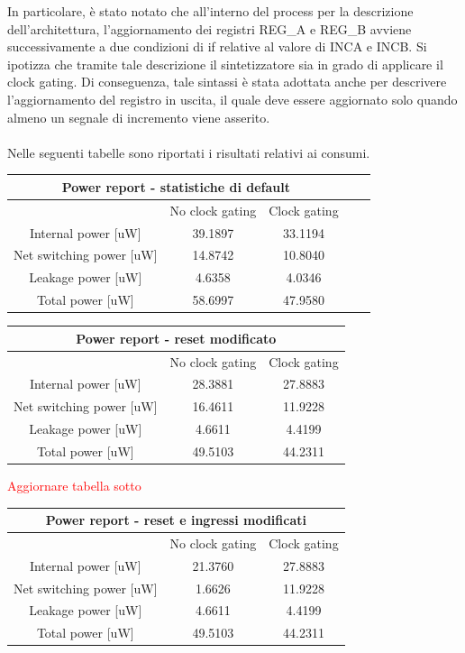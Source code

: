 \documentclass[11pt,  english, makeidx, a4paper, titlepage, oneside]{book}
\begin{document}
In particolare, è stato notato che all'interno del process per la descrizione dell'architettura, l'aggiornamento dei registri REG\_A e REG\_B avviene successivamente a due condizioni di if relative al valore di INCA e INCB. Si ipotizza che tramite tale descrizione il sintetizzatore sia in grado di applicare il clock gating. Di conseguenza, tale sintassi è stata adottata anche per descrivere l'aggiornamento del registro in uscita, il quale deve essere aggiornato solo quando almeno un segnale di incremento viene asserito.
\\\\
Nelle seguenti tabelle sono riportati i risultati relativi ai consumi.      
\begin{center}
	\begin{tabular}{|c|c|c|c|c|}
	\hline
	\multicolumn{3}{c}{Power report - statistiche di default}\\
	\hline
	& No clock gating & Clock gating \\
	\hline
	Internal power [uW] & 39.1897 & 33.1194 \\
	\hline
	Net switching power [uW] & 14.8742  & 10.8040 \\
	\hline
	Leakage power [uW] & 4.6358 & 4.0346 \\
	\hline
	Total power [uW] & 58.6997 & 47.9580 \\
	\hline
	\end{tabular}	
\end{center}
\vspace{0.3cm}      
\begin{center}
	\begin{tabular}{|c|c|c|}
	\hline
	\multicolumn{3}{c}{Power report - reset modificato}\\
	\hline
	& No clock gating & Clock gating \\
	\hline
	Internal power [uW] & 28.3881 & 27.8883 \\
	\hline 
 	Net switching power [uW] & 16.4611 & 11.9228 \\
	\hline
	Leakage power [uW] & 4.6611 & 4.4199 \\
	\hline
	Total power [uW] & 49.5103 & 44.2311 \\
	\hline
	\end{tabular}	
\end{center}
\vspace{0.3cm} 
\textcolor{red}{Aggiornare tabella sotto}          
\begin{center}
	\begin{tabular}{|c|c|c|}
	\hline
	\multicolumn{3}{c}{Power report - reset e ingressi modificati}\\
	\hline
	& No clock gating & Clock gating \\
	\hline
	Internal power [uW] & 21.3760 & 27.8883 \\
	\hline 
 	Net switching power [uW] & 1.6626 & 11.9228 \\
	\hline
	Leakage power [uW] & 4.6611 & 4.4199 \\
	\hline
	Total power [uW] & 49.5103 & 44.2311 \\
	\hline
	\end{tabular}	
\end{center}
\end{document}
